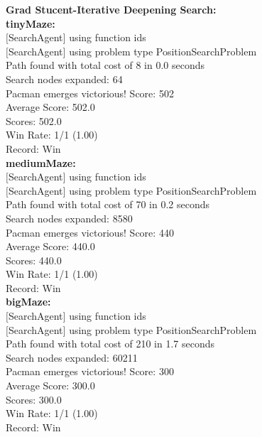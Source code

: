 \documentclass[11pt]{article}
\begin{document}
\newpage
\noindent
\textbf{Grad Stucent-Iterative Deepening Search:}\\
\textbf{tinyMaze:}\\
$[$SearchAgent$]$ using function ids\\
$[$SearchAgent$]$ using problem type PositionSearchProblem\\
Path found with total cost of 8 in 0.0 seconds\\
Search nodes expanded: 64\\
Pacman emerges victorious! Score: 502\\
Average Score: 502.0\\
Scores:        502.0\\
Win Rate:      1/1 (1.00)\\
Record:        Win\\

\noindent
\textbf{mediumMaze:}\\
$[$SearchAgent$]$ using function ids\\
$[$SearchAgent$]$ using problem type PositionSearchProblem\\
Path found with total cost of 70 in 0.2 seconds\\
Search nodes expanded: 8580\\
Pacman emerges victorious! Score: 440\\
Average Score: 440.0\\
Scores:        440.0\\
Win Rate:      1/1 (1.00)\\
Record:        Win\\

\noindent
\textbf{bigMaze:}\\
$[$SearchAgent$]$ using function ids\\
$[$SearchAgent$]$ using problem type PositionSearchProblem\\
Path found with total cost of 210 in 1.7 seconds\\
Search nodes expanded: 60211\\
Pacman emerges victorious! Score: 300\\
Average Score: 300.0\\
Scores:        300.0\\
Win Rate:      1/1 (1.00)\\
Record:        Win\\
\end{document}
